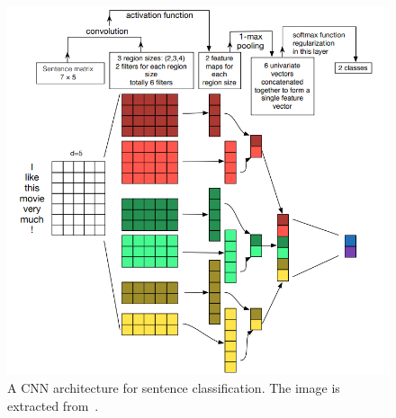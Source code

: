 







\begin{figure}[h]
\centering
 \includegraphics[width=\linewidth]{Figures/fig_cnn_for_text_cat.png}
 \caption{A CNN architecture for sentence classification. The image is extracted from~\protect\cite{DBLP:conf/ijcnlp/ZhangW17}.}
 \label{fig:cnn_text_cat}
\end{figure}

